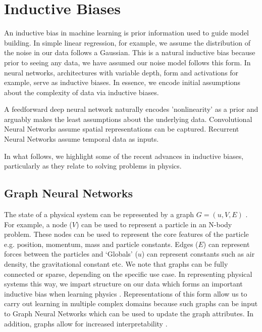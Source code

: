 \documentclass{article}
\begin{document}
\section{Inductive Biases}

An inductive bias in machine learning is prior information used to guide model building. In simple linear regression, for example, we assume the distribution of the noise in our data follows a Gaussian. This is a natural inductive bias because prior to seeing any data, we have assumed our noise model follows this form. In neural networks, architectures with variable depth, form and activations for example, serve as inductive biases. In essence, we encode initial assumptions about the complexity of data via inductive biases. 

A feedforward deep neural network naturally encodes 'nonlinearity' as a prior and arguably makes the least assumptions about the underlying data. Convolutional Neural Networks assume spatial representations can be captured. Recurrent Neural Networks assume temporal data as inputs. 

In what follows, we highlight some of the recent advances in inductive biases, particularly as they relate to solving problems in physics.

\subsection{Graph Neural Networks}

The state of a physical system can be represented by a graph $G = (u,V,E)$ \cite{battaglia_relational_2018}. For example, a node ($V$) can be used to represent a particle in an N-body problem. These nodes can be used to represent the core features of the particle e.g. position, momentum, mass and particle constants. Edges ($E$) can represent forces between the particles and `Globals' ($u$) can represent constants such as air density, the gravitational constant etc. We note that graphs can be fully connected or sparse, depending on the specific use case. In representing physical systems this way, we impart structure on our data which forms an important inductive bias when learning physics \cite{battaglia_interaction_2016, battaglia_relational_2018, sanchez-gonzalez_graph_2018,seo_differentiable_2019,cranmer_learning_2019, seo_physics-aware_2020, sanchez-gonzalez_learning_2020,lamb_graph_2020,cranmer_lagrangian_2020}. Representations of this form allow us to carry out learning in multiple complex domains because such graphs can be input to Graph Neural Networks which can be used to update the graph attributes. In addition, graphs allow for increased interpretability \cite{battaglia_relational_2018}.
\end{document}
